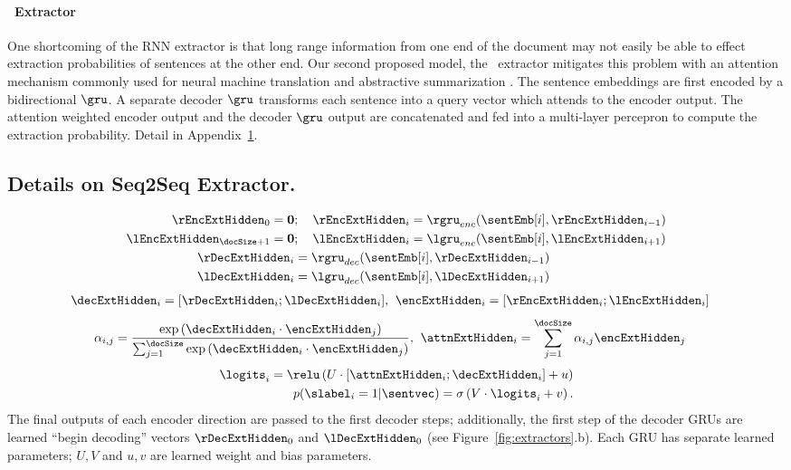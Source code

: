 \paragraph{\sts~Extractor} One shortcoming of the RNN extractor is that long range
information from one end of the document may not easily be able to effect 
extraction probabilities of sentences at the other end. 
Our second proposed model, the \sts~extractor mitigates this problem with an 
attention 
mechanism commonly
used for neural machine translation \cite{bahdanau2014neural} and 
abstractive summarization \cite{see2017get}. 
The sentence embeddings are first
encoded by a bidirectional $\gru$. A separate decoder $\gru$ transforms each 
sentence into a query vector which attends to the encoder output. The
attention weighted encoder output and the decoder $\gru$ output are concatenated
and fed into a multi-layer percepron to compute the extraction probability.
Detail in Appendix~\ref{app:s2sextractor}.
\begin{toappendix}
\section{Details on Seq2Seq Extractor.} \label{app:s2sextractor}
\begin{align}
    \rEncExtHidden_0 = \textbf{0}&;\quad \rEncExtHidden_i = \rgru_{enc}(\sentEmb[i], \rEncExtHidden_{i-1}) \\
    \lEncExtHidden_{\docSize + 1} = \textbf{0}&;\quad  \lEncExtHidden_i = \lgru_{enc}(\sentEmb[i], \lEncExtHidden_{i+1}) \\
    \rDecExtHidden_i &= \rgru_{dec}(\sentEmb[i], \rDecExtHidden_{i-1}) \\
    \lDecExtHidden_i &= \lgru_{dec}(\sentEmb[i], \lDecExtHidden_{i+1}) 
\end{align}
\begin{align}
 \decExtHidden_i = [\rDecExtHidden_i; \lDecExtHidden_i], &\;\;
 \encExtHidden_i = [\rEncExtHidden_i; \lEncExtHidden_i] 
\end{align}
\begin{align}
 \alpha_{i,j} = 
   \frac{\exp \left(\decExtHidden_i \cdot \encExtHidden_j \right)}{
   \sum_{j=1}^{\docSize}\exp\left(\decExtHidden_i \cdot \encExtHidden_j\right)}, 
& \;\; \attnExtHidden_i = \sum_{j=1}^{\docSize} \alpha_{i,j} \encExtHidden_j 
\end{align}
\begin{align}
   \logits_i = \relu\left(U \cdot [\attnExtHidden_i; \decExtHidden_i] + u \right)&\\
   p(\slabel_i=1|\sentvec) = \sigma\left(V\cdot \logits_i + v  \right).
\end{align}
The final outputs of each encoder direction are passed to the first decoder
steps; additionally, the first step of the decoder GRUs are learned 
``begin decoding'' vectors $\rDecExtHidden_0$ and $\lDecExtHidden_0$ 
(see Figure~\ref{fig:extractors}.b).
Each GRU has separate learned 
parameters; $U, V$ and $u, v$ are learned weight and bias parameters.
\end{toappendix}

